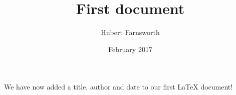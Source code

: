 \documentclass[12pt, letterpaper, twoside]{article}
\title{First document}
\author{Hubert Farnsworth}
\date{February 2017}
\begin{document}
\maketitle

We have now added a title, author and date to our first \LaTeX{} document!
\end{document}
